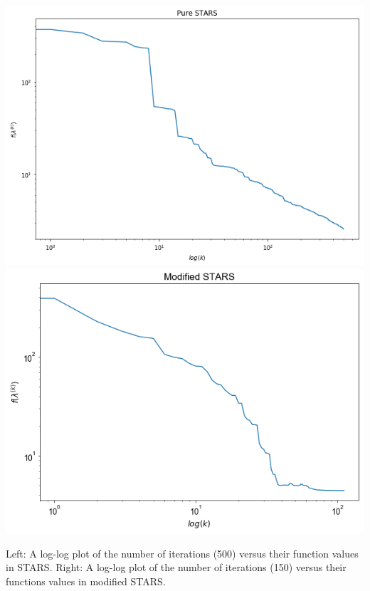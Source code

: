 \documentclass[11pt]{beamer}
\begin{document}
\begin{frame}


\begin{center}

 
\includegraphics[scale=0.25]{pure_stars.png} \includegraphics[scale=0.25]{mod_stars.png}

Left: A log-log plot of the number of iterations (500) versus their function values in STARS. Right: A log-log plot of the number of iterations (150) versus their functions values in modified STARS.

\end{center}


\end{frame}

\end{document}
